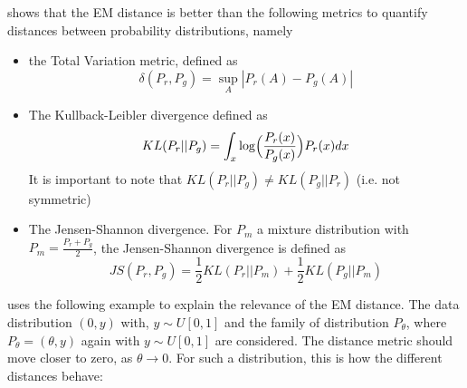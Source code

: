 \documentclass[11pt,a4paper,twoside]{report}
\begin{document}
\cite{arjovsky2017wasserstein} shows that the EM distance is better than the following metrics to quantify distances between probability distributions, namely

\begin{itemize}
    \item the Total Variation metric, defined as
    \begin{equation}
        \delta(P_r, P_g) = \sup_{A} |P_r(A) -  P_g(A)|
    \end{equation}
    \item The Kullback-Leibler divergence defined as
    \begin{equation}
        KL(P_r||P_g) = \int_x  \log \Bigl( \frac{P_r(x)}{P_g(x)} \Bigr) P_r(x) dx
    \end{equation}
    It is important to note that $KL(P_r||P_g) \neq KL(P_g||P_r)$ (i.e. not symmetric)
    \item The Jensen-Shannon divergence. For $P_m$ a mixture distribution with $P_m = \frac{P_r + P_g}{2}$, the Jensen-Shannon divergence is defined as  
    \begin{equation}
        JS(P_r, P_g) = \frac{1}{2} KL(P_r||P_m) + \frac{1}{2} KL(P_g||P_m)
    \end{equation}
\end{itemize}

\cite{arjovsky2017wasserstein} uses the following example to explain the relevance of the EM distance. The data distribution $(0, y)$ with, $y \sim U[0,1]$ and the family of distribution $P_{\theta}$, where $P_{\theta} = (\theta, y)$ again with $y \sim U[0,1]$ are considered. The distance metric should move closer to zero, as $\theta \rightarrow 0$. For such a distribution, this is how the different distances behave:
\end{document}
